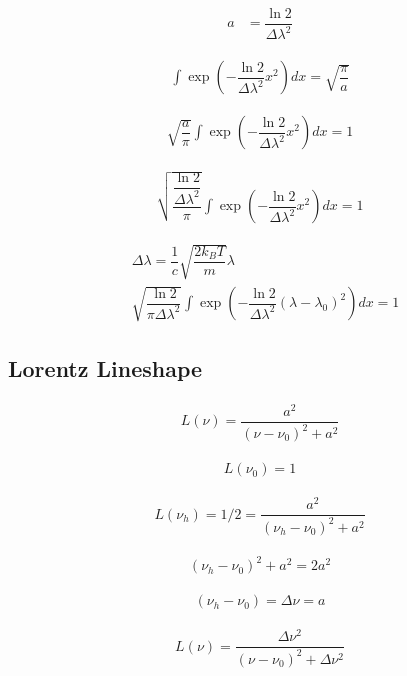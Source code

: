 \begin{align}
	a &= \dfrac{\ln{2}}{\Delta \lambda^2}
\end{align}

\begin{align}
	\int \exp\left(- \dfrac{\ln{2}}{\Delta \lambda^2} x^2\right) dx = \sqrt{\dfrac{\pi}{a}}
\end{align}

\begin{align}
	\sqrt{\dfrac{a}{\pi}} \int \exp\left(- \dfrac{\ln{2}}{\Delta \lambda^2} x^2\right) dx = 1
\end{align}

\begin{align}
	\sqrt{\dfrac{\dfrac{\ln{2}}{\Delta \lambda^2}}{\pi}} \int \exp\left(- \dfrac{\ln{2}}{\Delta \lambda^2} x^2\right) dx = 1
\end{align}

\begin{align}
	&\Delta \lambda = \dfrac{1}{c} \sqrt{\dfrac{2 k_B T}{m}} \lambda \\
	&\sqrt{\dfrac{\ln{2}}{\pi \Delta \lambda^2}} \int \exp\left(- \dfrac{\ln{2}}{\Delta \lambda^2} (\lambda - \lambda_0)^2\right) dx = 1
\end{align}

\subsection{Lorentz Lineshape}

\begin{align}
	L(\nu) = \dfrac{a^2}{ (\nu - \nu_0)^2 + a^2}
\end{align}

\begin{align}
	L(\nu_0) = 1
\end{align}

\begin{align}
	L(\nu_h) = 1/2  = \dfrac{a^2}{ (\nu_h - \nu_0)^2 + a^2}
\end{align}

\begin{align}
	 (\nu_h - \nu_0)^2 + a^2 = 2 a^2
\end{align}

\begin{align}
	(\nu_h - \nu_0) = \Delta \nu = a
\end{align}

\begin{align}
	L(\nu) = \dfrac{\Delta \nu^2}{ (\nu - \nu_0)^2 + \Delta \nu^2}
\end{align}

